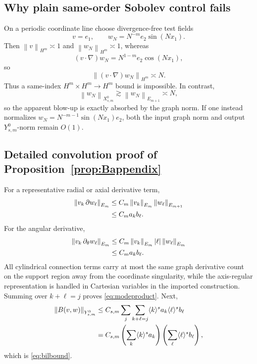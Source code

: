 \documentclass[11pt]{article}
\numberwithin{equation}{section}
\newcommand{\norm}[1]{\left\lVert #1\right\rVert}
\begin{document}
\subsection{Why plain same-order Sobolev control fails}
On a periodic coordinate line choose divergence-free test fields
\begin{equation}
v=e_1,
\qquad
w_N=N^{-m}e_2\sin(Nx_1).
\label{eq:hfcounter}
\end{equation}
Then \(\norm v_{H^m}\asymp1\) and \(\norm{w_N}_{H^m}\asymp1\), whereas
\begin{equation}
(v\cdot\nabla)w_N=N^{1-m}e_2\cos(Nx_1),
\label{eq:hfconv}
\end{equation}
so
\begin{equation}
\norm{(v\cdot\nabla)w_N}_{H^m}\asymp N.
\label{eq:hfblow}
\end{equation}
Thus a same-index \(H^m\times H^m\to H^m\) bound is impossible.  In contrast,
\begin{equation}
\norm{w_N}_{X^0_{s,m}}\gtrsim\norm{w_N}_{E_{m+1}}\asymp N,
\label{eq:hfgraph}
\end{equation}
so the apparent blow-up is exactly absorbed by the graph norm.  If one instead normalizes \(w_N=N^{-m-1}\sin(Nx_1)e_2\), both the input graph norm and output \(Y^0_{s,m}\)-norm remain \(O(1)\).

\subsection{Detailed convolution proof of Proposition~\ref{prop:Bappendix}}
For a representative radial or axial derivative term,
\begin{align}
\norm{v_k\,\partial w_\ell}_{E_m}
&\le C_m\norm{v_k}_{E_m}\norm{w_\ell}_{E_{m+1}}\notag\\
&\le C_ma_kb_\ell.
\label{eq:convra}
\end{align}
For the angular derivative,
\begin{align}
\norm{v_k\,\partial_\theta w_\ell}_{E_m}
&\le C_m\norm{v_k}_{E_m}|\ell|\norm{w_\ell}_{E_m}\notag\\
&\le C_ma_kb_\ell.
\label{eq:convtheta}
\end{align}
All cylindrical connection terms carry at most the same graph derivative count on the support region away from the coordinate singularity, while the axis-regular representation is handled in Cartesian variables in the imported construction.  Summing over \(k+\ell=j\) proves \eqref{eq:modeproduct}.  Next,
\begin{align}
\norm{B(v,w)}_{Y^0_{s,m}}
&\le C_{s,m}\sum_j\sum_{k+\ell=j}\langle k\rangle^sa_k\langle\ell\rangle^sb_\ell\notag\\
&=C_{s,m}\left(\sum_k\langle k\rangle^sa_k\right)
\left(\sum_\ell\langle\ell\rangle^sb_\ell\right),
\label{eq:young}
\end{align}
which is \eqref{eq:bilbound}.
\end{document}
